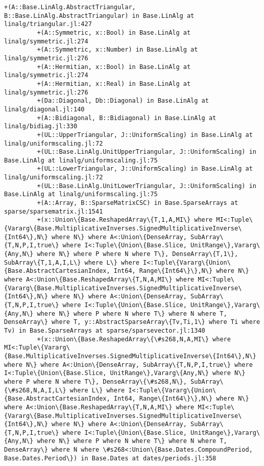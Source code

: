 \documentclass[11pt]{article}
\begin{document}
\begin{Verbatim}[commandchars=\\\{\}]
         +(A::Base.LinAlg.AbstractTriangular, B::Base.LinAlg.AbstractTriangular) in Base.LinAlg at linalg/triangular.jl:427
         +(A::Symmetric, x::Bool) in Base.LinAlg at linalg/symmetric.jl:274
         +(A::Symmetric, x::Number) in Base.LinAlg at linalg/symmetric.jl:276
         +(A::Hermitian, x::Bool) in Base.LinAlg at linalg/symmetric.jl:274
         +(A::Hermitian, x::Real) in Base.LinAlg at linalg/symmetric.jl:276
         +(Da::Diagonal, Db::Diagonal) in Base.LinAlg at linalg/diagonal.jl:140
         +(A::Bidiagonal, B::Bidiagonal) in Base.LinAlg at linalg/bidiag.jl:330
         +(UL::UpperTriangular, J::UniformScaling) in Base.LinAlg at linalg/uniformscaling.jl:72
         +(UL::Base.LinAlg.UnitUpperTriangular, J::UniformScaling) in Base.LinAlg at linalg/uniformscaling.jl:75
         +(UL::LowerTriangular, J::UniformScaling) in Base.LinAlg at linalg/uniformscaling.jl:72
         +(UL::Base.LinAlg.UnitLowerTriangular, J::UniformScaling) in Base.LinAlg at linalg/uniformscaling.jl:75
         +(A::Array, B::SparseMatrixCSC) in Base.SparseArrays at sparse/sparsematrix.jl:1541
         +(x::Union\{Base.ReshapedArray\{T,1,A,MI\} where MI<:Tuple\{Vararg\{Base.MultiplicativeInverses.SignedMultiplicativeInverse\{Int64\},N\} where N\} where A<:Union\{DenseArray, SubArray\{T,N,P,I,true\} where I<:Tuple\{Union\{Base.Slice, UnitRange\},Vararg\{Any,N\} where N\} where P where N where T\}, DenseArray\{T,1\}, SubArray\{T,1,A,I,L\} where L\} where I<:Tuple\{Vararg\{Union\{Base.AbstractCartesianIndex, Int64, Range\{Int64\}\},N\} where N\} where A<:Union\{Base.ReshapedArray\{T,N,A,MI\} where MI<:Tuple\{Vararg\{Base.MultiplicativeInverses.SignedMultiplicativeInverse\{Int64\},N\} where N\} where A<:Union\{DenseArray, SubArray\{T,N,P,I,true\} where I<:Tuple\{Union\{Base.Slice, UnitRange\},Vararg\{Any,N\} where N\} where P where N where T\} where N where T, DenseArray\} where T, y::AbstractSparseArray\{Tv,Ti,1\} where Ti where Tv) in Base.SparseArrays at sparse/sparsevector.jl:1340
         +(x::Union\{Base.ReshapedArray\{\#s268,N,A,MI\} where MI<:Tuple\{Vararg\{Base.MultiplicativeInverses.SignedMultiplicativeInverse\{Int64\},N\} where N\} where A<:Union\{DenseArray, SubArray\{T,N,P,I,true\} where I<:Tuple\{Union\{Base.Slice, UnitRange\},Vararg\{Any,N\} where N\} where P where N where T\}, DenseArray\{\#s268,N\}, SubArray\{\#s268,N,A,I,L\} where L\} where I<:Tuple\{Vararg\{Union\{Base.AbstractCartesianIndex, Int64, Range\{Int64\}\},N\} where N\} where A<:Union\{Base.ReshapedArray\{T,N,A,MI\} where MI<:Tuple\{Vararg\{Base.MultiplicativeInverses.SignedMultiplicativeInverse\{Int64\},N\} where N\} where A<:Union\{DenseArray, SubArray\{T,N,P,I,true\} where I<:Tuple\{Union\{Base.Slice, UnitRange\},Vararg\{Any,N\} where N\} where P where N where T\} where N where T, DenseArray\} where N where \#s268<:Union\{Base.Dates.CompoundPeriod, Base.Dates.Period\}) in Base.Dates at dates/periods.jl:358

\end{Verbatim}
\end{document}
